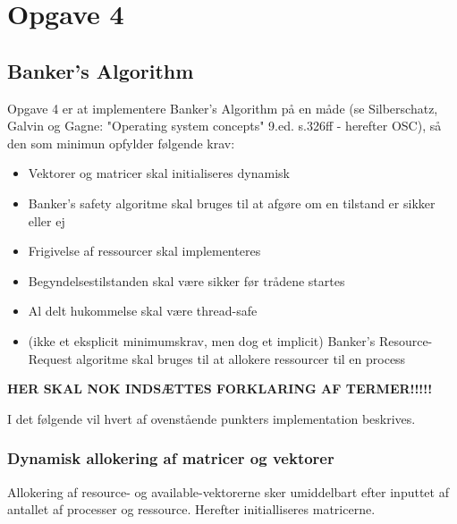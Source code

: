 \section{Opgave 4}
\subsection{Banker's Algorithm}
Opgave 4 er at implementere Banker's Algorithm på en måde (se Silberschatz, Galvin og Gagne: "Operating system concepts" 9.ed. s.326ff - herefter OSC), så den som minimun opfylder følgende krav:
\begin{itemize}
	\item Vektorer og matricer skal initialiseres dynamisk
	\item Banker's safety algoritme skal bruges til at afgøre om en tilstand er sikker eller ej
	\item Frigivelse af ressourcer skal implementeres
	\item Begyndelsestilstanden skal være sikker før trådene startes
	\item Al delt hukommelse skal være thread-safe
	\item (ikke et eksplicit minimumskrav, men dog et implicit) Banker's Resource-Request algoritme skal bruges til at allokere ressourcer til en process
\end{itemize}

\textbf{HER SKAL NOK INDSÆTTES FORKLARING AF TERMER!!!!!}

I det følgende vil hvert af ovenstående punkters implementation beskrives.

\subsubsection*{Dynamisk allokering af matricer og vektorer}
Allokering af resource- og available-vektorerne sker umiddelbart efter inputtet af antallet af processer og ressource. Herefter initialliseres matricerne.

